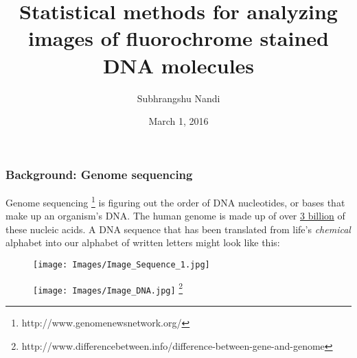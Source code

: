 \documentclass[10pt,dvipsnames,table]{beamer}
\title[Statistics for fluoroscanning]{Statistical methods for analyzing images of fluorochrome stained DNA molecules}
\author{Subhrangshu Nandi}
\institute[Prelim exam]{Preliminary Exam \\
Department of Statistics \\
University of Wisconsin-Madison}
\date{March 1, 2016}
\begin{document}
\setlength{\baselineskip}{16truept}

\frame{\maketitle}

\begin{frame}
\frametitle{Background: Genome sequencing}
Genome sequencing \footnote{http://www.genomenewsnetwork.org/} is figuring out the order of DNA nucleotides, or bases that make up an organism's DNA. The human genome is made up of over {\underline{3 billion}} of these nucleic acids. A DNA sequence that has been translated from life's {\emph{chemical}} alphabet into our alphabet of written letters might look like this:
\begin{figure}[H]
\texttt{[image: Images/Image\_Sequence\_1.jpg]}
\end{figure}

\begin{figure}[H]
\texttt{[image: Images/Image\_DNA.jpg]} \footnote{http://www.differencebetween.info/difference-between-gene-and-genome}
\end{figure}

\note{}
\end{frame}
\end{document}
